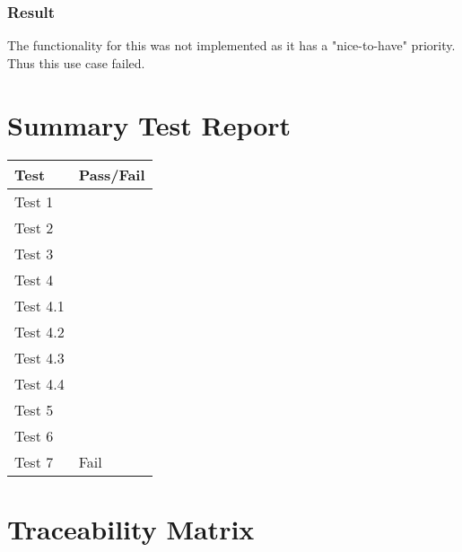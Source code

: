 \documentclass[11pt]{article}
\begin{document}
\subsubsection{Result}
The functionality for this was not implemented as it has a "nice-to-have" priority. Thus this use case failed.

\section{Summary Test Report}
\begin{table}[h]
\begin{tabular}{ll}
\textbf{Test}     & \textbf{Pass/Fail} \\ \hline
\multicolumn{1}{|L{10cm}|}{Test 1} & \multicolumn{1}{L{2cm}|}{} \\ \hline
\multicolumn{1}{|L{10cm}|}{Test 2} & \multicolumn{1}{L{2cm}|}{} \\ \hline
\multicolumn{1}{|L{10cm}|}{Test 3} & \multicolumn{1}{L{2cm}|}{} \\ \hline
\multicolumn{1}{|L{10cm}|}{Test 4} & \multicolumn{1}{L{2cm}|}{} \\ \hline
\multicolumn{1}{|L{10cm}|}{Test 4.1} & \multicolumn{1}{L{2cm}|}{} \\ \hline
\multicolumn{1}{|L{10cm}|}{Test 4.2} & \multicolumn{1}{L{2cm}|}{} \\ \hline
\multicolumn{1}{|L{10cm}|}{Test 4.3} & \multicolumn{1}{L{2cm}|}{} \\ \hline
\multicolumn{1}{|L{10cm}|}{Test 4.4} & \multicolumn{1}{L{2cm}|}{} \\ \hline
\multicolumn{1}{|L{10cm}|}{Test 5} & \multicolumn{1}{L{2cm}|}{} \\ \hline
\multicolumn{1}{|L{10cm}|}{Test 6} & \multicolumn{1}{L{2cm}|}{} \\ \hline
\multicolumn{1}{|L{10cm}|}{Test 7} & \multicolumn{1}{L{2cm}|}{Fail} \\ \hline
\end{tabular}
\end{table}

\section{Traceability Matrix}
\end{document}
